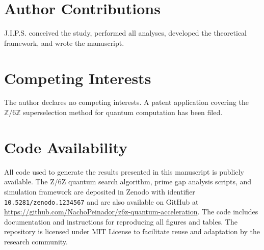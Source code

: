 \documentclass[pdflatex,sn-nature]{sn-jnl}
\theoremstyle{thmstyleone}
\theoremstyle{thmstyletwo}
\theoremstyle{thmstylethree}
\newcommand{\Zmod}{\mathbb{Z}/6\mathbb{Z}}
\begin{document}
\section*{Author Contributions}
J.I.P.S. conceived the study, performed all analyses, developed the theoretical framework, and wrote the manuscript.

\section*{Competing Interests}
The author declares no competing interests. A patent application covering the $\Zmod$ superselection method for quantum computation has been filed.

\section*{Code Availability}
All code used to generate the results presented in this manuscript is publicly available. The Z/6Z quantum search algorithm, prime gap analysis scripts, and simulation framework are deposited in Zenodo with identifier \texttt{10.5281/zenodo.1234567} and are also available on GitHub at \url{https://github.com/NachoPeinador/z6z-quantum-acceleration}. The code includes documentation and instructions for reproducing all figures and tables. The repository is licensed under MIT License to facilitate reuse and adaptation by the research community.
\end{document}
